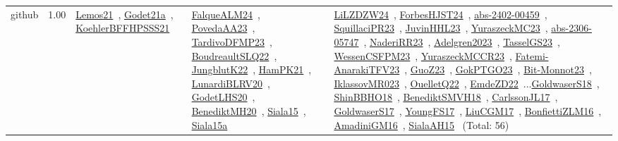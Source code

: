 {\begin{longtable}{p{3cm}r>{\raggedright\arraybackslash}p{6cm}>{\raggedright\arraybackslash}p{6cm}>{\raggedright\arraybackslash}p{8cm}}
\index{github}\index{Benchmarks!github}github &  1.00 & \href{../works/Lemos21.pdf}{Lemos21}~\cite{Lemos21}, \href{../works/Godet21a.pdf}{Godet21a}~\cite{Godet21a}, \href{../works/KoehlerBFFHPSSS21.pdf}{KoehlerBFFHPSSS21}~\cite{KoehlerBFFHPSSS21} & \href{../works/FalqueALM24.pdf}{FalqueALM24}~\cite{FalqueALM24}, \href{../works/PovedaAA23.pdf}{PovedaAA23}~\cite{PovedaAA23}, \href{../works/TardivoDFMP23.pdf}{TardivoDFMP23}~\cite{TardivoDFMP23}, \href{../works/BoudreaultSLQ22.pdf}{BoudreaultSLQ22}~\cite{BoudreaultSLQ22}, \href{../works/JungblutK22.pdf}{JungblutK22}~\cite{JungblutK22}, \href{../works/HamPK21.pdf}{HamPK21}~\cite{HamPK21}, \href{../works/LunardiBLRV20.pdf}{LunardiBLRV20}~\cite{LunardiBLRV20}, \href{../works/GodetLHS20.pdf}{GodetLHS20}~\cite{GodetLHS20}, \href{../works/BenediktMH20.pdf}{BenediktMH20}~\cite{BenediktMH20}, \href{../works/Siala15.pdf}{Siala15}~\cite{Siala15}, \href{../works/Siala15a.pdf}{Siala15a}~\cite{Siala15a} & \href{../works/LiLZDZW24.pdf}{LiLZDZW24}~\cite{LiLZDZW24}, \href{../works/ForbesHJST24.pdf}{ForbesHJST24}~\cite{ForbesHJST24}, \href{../works/abs-2402-00459.pdf}{abs-2402-00459}~\cite{abs-2402-00459}, \href{../works/SquillaciPR23.pdf}{SquillaciPR23}~\cite{SquillaciPR23}, \href{../works/JuvinHHL23.pdf}{JuvinHHL23}~\cite{JuvinHHL23}, \href{../works/YuraszeckMC23.pdf}{YuraszeckMC23}~\cite{YuraszeckMC23}, \href{../works/abs-2306-05747.pdf}{abs-2306-05747}~\cite{abs-2306-05747}, \href{../works/NaderiRR23.pdf}{NaderiRR23}~\cite{NaderiRR23}, \href{../works/Adelgren2023.pdf}{Adelgren2023}~\cite{Adelgren2023}, \href{../works/TasselGS23.pdf}{TasselGS23}~\cite{TasselGS23}, \href{../works/WessenCSFPM23.pdf}{WessenCSFPM23}~\cite{WessenCSFPM23}, \href{../works/YuraszeckMCCR23.pdf}{YuraszeckMCCR23}~\cite{YuraszeckMCCR23}, \href{../works/Fatemi-AnarakiTFV23.pdf}{Fatemi-AnarakiTFV23}~\cite{Fatemi-AnarakiTFV23}, \href{../works/GuoZ23.pdf}{GuoZ23}~\cite{GuoZ23}, \href{../works/GokPTGO23.pdf}{GokPTGO23}~\cite{GokPTGO23}, \href{../works/Bit-Monnot23.pdf}{Bit-Monnot23}~\cite{Bit-Monnot23}, \href{../works/IklassovMR023.pdf}{IklassovMR023}~\cite{IklassovMR023}, \href{../works/OuelletQ22.pdf}{OuelletQ22}~\cite{OuelletQ22}, \href{../works/EmdeZD22.pdf}{EmdeZD22}~\cite{EmdeZD22}...\href{../works/GoldwaserS18.pdf}{GoldwaserS18}~\cite{GoldwaserS18}, \href{../works/ShinBBHO18.pdf}{ShinBBHO18}~\cite{ShinBBHO18}, \href{../works/BenediktSMVH18.pdf}{BenediktSMVH18}~\cite{BenediktSMVH18}, \href{../works/CarlssonJL17.pdf}{CarlssonJL17}~\cite{CarlssonJL17}, \href{../works/GoldwaserS17.pdf}{GoldwaserS17}~\cite{GoldwaserS17}, \href{../works/YoungFS17.pdf}{YoungFS17}~\cite{YoungFS17}, \href{../works/LiuCGM17.pdf}{LiuCGM17}~\cite{LiuCGM17}, \href{../works/BonfiettiZLM16.pdf}{BonfiettiZLM16}~\cite{BonfiettiZLM16}, \href{../works/AmadiniGM16.pdf}{AmadiniGM16}~\cite{AmadiniGM16}, \href{../works/SialaAH15.pdf}{SialaAH15}~\cite{SialaAH15} (Total: 56)\\

\end{longtable}}
